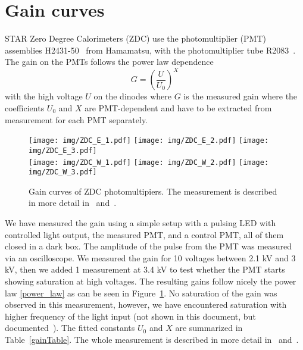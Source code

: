 \section{Gain curves}
STAR Zero Degree Calorimeters (ZDC) use the photomultiplier (PMT) assemblies H2431-50~\cite{H2431} from Hamamatsu, with the photomultiplier tube R2083~\cite{R2083}. The gain on the PMTs follows the power law dependence
\begin{equation} \label{power_law}
G = \left(\frac{U}{U_0} \right)^X
\end{equation}
with the high voltage $U$ on the dinodes where $G$ is the measured gain where the coefficients $U_0$ and $X$ are PMT-dependent and have to be extracted from measurement for each PMT separately.

\begin{figure}[htb]
\begin{center}
\texttt{[image: img/ZDC\_E\_1.pdf]}
\texttt{[image: img/ZDC\_E\_2.pdf]}
\texttt{[image: img/ZDC\_E\_3.pdf]}\\
\texttt{[image: img/ZDC\_W\_1.pdf]}
\texttt{[image: img/ZDC\_W\_2.pdf]}
\texttt{[image: img/ZDC\_W\_3.pdf]}
\end{center}
\caption{\label{gainCurves}Gain curves of ZDC photomultipiers. The measurement is described in more detail in~\cite{table} and~\cite{ZDC_PMT_presentation}.}
\end{figure}

We have measured the gain using a simple setup with a pulsing LED with controlled light output, the measured PMT, and a control PMT, all of them closed in a dark box. The amplitude of the pulse from the PMT was measured via an oscilloscope. We measured the gain for 10 voltages between 2.1 kV and 3 kV, then we added 1 measurement at 3.4 kV to test whether the PMT starts showing saturation at high voltages\@. The resulting gains follow nicely the power law \eqref{power_law} as can be seen in Figure~\ref{gainCurves}. No saturation of the gain was observed in this measurement, however, we have encountered saturation with higher frequency of the light input (not shown in this document, but documented~\cite{table})\@. The fitted constants $U_0$ and $X$ are summarized in Table~\ref{gainTable}. The whole measurement is described in more detail in~\cite{table} and~\cite{ZDC_PMT_presentation}.


